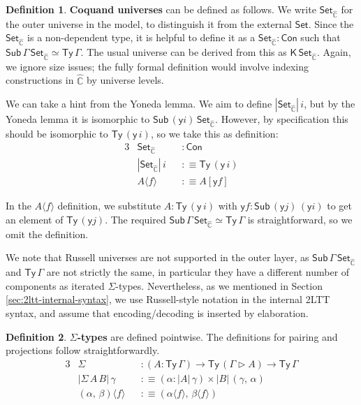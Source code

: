 \documentclass[12pt,a4paper,twoside,openany]{book}
\theoremstyle{remark}
\theoremstyle{definition}
\newtheorem{mydefinition}{Definition}
\theoremstyle{theorem}
\newcommand{\ms}[1]{\mathsf{#1}}
\newcommand{\mbb}[1]{\mathbb{#1}}
\newcommand{\Con}{\mathsf{Con}}
\newcommand{\Sub}{\mathsf{Sub}}
\newcommand{\Ty}{\mathsf{Ty}}
\newcommand{\Set}{\mathsf{Set}}
\newcommand{\ext}{\triangleright}
\newcommand{\K}{\mathsf{K}}
\newcommand{\hmbbC}{\hat{\mbb{C}}}
\newcommand{\lab}{\langle}
\newcommand{\rab}{\rangle}
\newcommand{\defn}{:\equiv}
\newcommand{\yon}{\ms{y}}
\begin{document}
\begin{mydefinition}
\label{def:presheaf-univ}
\textbf{Coquand universes} can be defined as follows. We write $\Set_{\hmbbC}$
for the outer universe in the model, to distinguish it from the external
$\Set$. Since the $\Set_{\hmbbC}$ is a non-dependent type, it is helpful to
define it as a $\Set_{\hmbbC} : \Con$ such that $\Sub\,\Gamma\,\Set_{\hmbbC}
\simeq \Ty\,\Gamma$.  The usual universe can be derived from this as
$\K\,\Set_{\hmbbC}$. Again, we ignore size issues; the fully formal definition
would involve indexing constructions in $\hmbbC$ by universe levels.

We can take a hint from the Yoneda lemma. We aim to define $|\Set_{\hmbbC}|\,i$,
but by the Yoneda lemma it is isomorphic to $\Sub\,(\yon
i)\,\Set_{\hmbbC}$. However, by specification this should be isomorphic to
$\Ty\,(\yon\,i)$, so we take this as definition:
\begin{alignat*}{3}
  & \Set_{\hmbbC} &&: \Con\\
  &|\Set_{\hmbbC}|\,i &&\defn \Ty\,(\yon\,i)\\
  &A \lab f \rab &&\defn A[\yon f]
\end{alignat*}
\end{mydefinition}
In the $A \lab f \rab$ definition, we substitute $A : \Ty\,(\yon\,i)$ with $\yon
f : \Sub\,(\yon j)\,(\yon i)$ to get an element of $\Ty\,(\yon j)$.  The
required $\Sub\,\Gamma\,\Set_{\hmbbC} \simeq \Ty\,\Gamma$ is straightforward, so
we omit the definition.

We note that Russell universes are not supported in the outer layer, as
$\Sub\,\Gamma\,\Set_{\hmbbC}$ and $\Ty\,\Gamma$ are not strictly the same, in
particular they have a different number of components as iterated
$\Sigma$-types. Nevertheless, as we mentioned in Section
\ref{sec:2ltt-internal-syntax}, we use Russell-style notation in the internal
2LTT syntax, and assume that encoding/decoding is inserted by elaboration.

\begin{mydefinition}
\textbf{$\Sigma$-types} are defined pointwise. The definitions for pairing and
projections follow straightforwardly.
\begin{alignat*}{3}
  & \Sigma  &&: (A : \Ty\,\Gamma) \to \Ty\,(\Gamma\ext A) \to \Ty\,\Gamma\\    & |\Sigma\,A\,B|\,\gamma && \defn (\alpha : |A|\,\gamma) \times |B|\,(\gamma,\,\alpha)\\
  & (\alpha,\,\beta) \lab f \rab && \defn (\alpha \lab f \rab,\, \beta \lab f \rab)
\end{alignat*}
\end{mydefinition}
\end{document}

